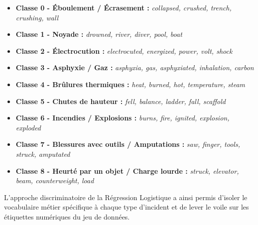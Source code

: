 \documentclass[12pt,a4paper]{article}
\begin{document}
	\begin{itemize}
		\item \textbf{Classe 0 - Éboulement / Écrasement :} \textit{collapsed, crushed, trench, crushing, wall}
		\item \textbf{Classe 1 - Noyade :} \textit{drowned, river, diver, pool, boat}
		\item \textbf{Classe 2 - Électrocution :} \textit{electrocuted, energized, power, volt, shock}
		\item \textbf{Classe 3 - Asphyxie / Gaz :} \textit{asphyxia, gas, asphyxiated, inhalation, carbon}
		\item \textbf{Classe 4 - Brûlures thermiques :} \textit{heat, burned, hot, temperature, steam}
		\item \textbf{Classe 5 - Chutes de hauteur :} \textit{fell, balance, ladder, fall, scaffold}
		\item \textbf{Classe 6 - Incendies / Explosions :} \textit{burns, fire, ignited, explosion, exploded}
		\item \textbf{Classe 7 - Blessures avec outils / Amputations :} \textit{saw, finger, tools, struck, amputated}
		\item \textbf{Classe 8 - Heurté par un objet / Charge lourde :} \textit{struck, elevator, beam, counterweight, load}
	\end{itemize}
	
	L'approche discriminatoire de la Régression Logistique a ainsi permis d'isoler le vocabulaire métier spécifique à chaque type d'incident et de lever le voile sur les étiquettes numériques du jeu de données.
	
\end{document}

